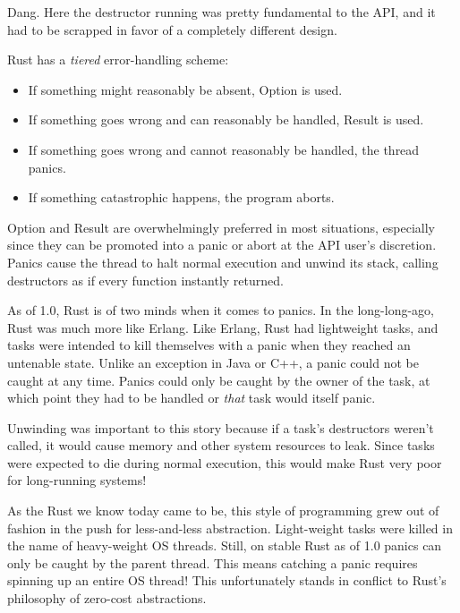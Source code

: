 \documentclass[a4paper,]{book}
\begin{document}
Dang. Here the destructor running was pretty fundamental to the API, and
it had to be scrapped in favor of a completely different design.


Rust has a \emph{tiered} error-handling scheme:

\begin{itemize}
\itemsep1pt\parskip0pt
\item
  If something might reasonably be absent, Option is used.
\item
  If something goes wrong and can reasonably be handled, Result is used.
\item
  If something goes wrong and cannot reasonably be handled, the thread
  panics.
\item
  If something catastrophic happens, the program aborts.
\end{itemize}

Option and Result are overwhelmingly preferred in most situations,
especially since they can be promoted into a panic or abort at the API
user's discretion. Panics cause the thread to halt normal execution and
unwind its stack, calling destructors as if every function instantly
returned.

As of 1.0, Rust is of two minds when it comes to panics. In the
long-long-ago, Rust was much more like Erlang. Like Erlang, Rust had
lightweight tasks, and tasks were intended to kill themselves with a
panic when they reached an untenable state. Unlike an exception in Java
or C++, a panic could not be caught at any time. Panics could only be
caught by the owner of the task, at which point they had to be handled
or \emph{that} task would itself panic.

Unwinding was important to this story because if a task's destructors
weren't called, it would cause memory and other system resources to
leak. Since tasks were expected to die during normal execution, this
would make Rust very poor for long-running systems!

As the Rust we know today came to be, this style of programming grew out
of fashion in the push for less-and-less abstraction. Light-weight tasks
were killed in the name of heavy-weight OS threads. Still, on stable
Rust as of 1.0 panics can only be caught by the parent thread. This
means catching a panic requires spinning up an entire OS thread! This
unfortunately stands in conflict to Rust's philosophy of zero-cost
abstractions.
\end{document}
